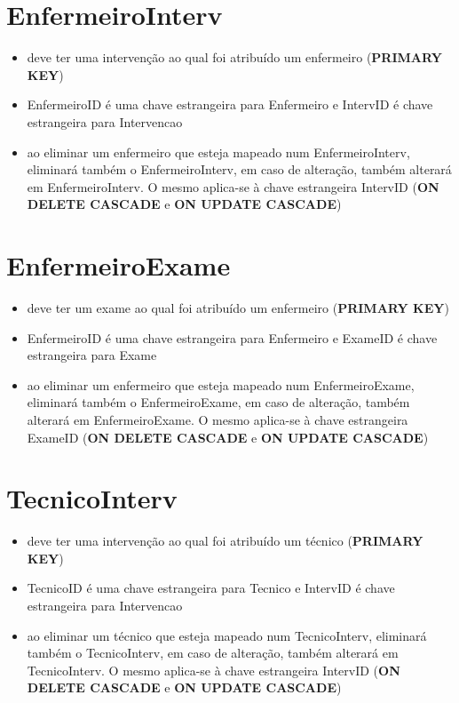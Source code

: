 \documentclass[article, a4paper, 12pt, oneside]{memoir}
\begin{document}
\section*{EnfermeiroInterv}
\begin{itemize}
	\item deve ter uma intervenção ao qual foi atribuído um enfermeiro (\textbf{PRIMARY KEY})
	\item EnfermeiroID é uma chave estrangeira para Enfermeiro e IntervID é chave estrangeira para Intervencao
	\item ao eliminar um enfermeiro que esteja mapeado num EnfermeiroInterv, eliminará também o EnfermeiroInterv, em caso de alteração, também alterará em EnfermeiroInterv. O mesmo aplica-se à chave estrangeira IntervID (\textbf{ON DELETE CASCADE} e \textbf{ON UPDATE CASCADE})
\end{itemize}

\section*{EnfermeiroExame}
\begin{itemize}
	\item deve ter um exame ao qual foi atribuído um enfermeiro (\textbf{PRIMARY KEY})
	\item EnfermeiroID é uma chave estrangeira para Enfermeiro e ExameID é chave estrangeira para Exame
	\item ao eliminar um enfermeiro que esteja mapeado num EnfermeiroExame, eliminará também o EnfermeiroExame, em caso de alteração, também alterará em EnfermeiroExame. O mesmo aplica-se à chave estrangeira ExameID (\textbf{ON DELETE CASCADE} e \textbf{ON UPDATE CASCADE})
\end{itemize}

\section*{TecnicoInterv}
\begin{itemize}
	\item deve ter uma intervenção ao qual foi atribuído um técnico (\textbf{PRIMARY KEY})
	\item TecnicoID é uma chave estrangeira para Tecnico e IntervID é chave estrangeira para Intervencao
	\item ao eliminar um técnico que esteja mapeado num TecnicoInterv, eliminará também o TecnicoInterv, em caso de alteração, também alterará em TecnicoInterv. O mesmo aplica-se à chave estrangeira IntervID (\textbf{ON DELETE CASCADE} e \textbf{ON UPDATE CASCADE})
\end{itemize}
\end{document}
